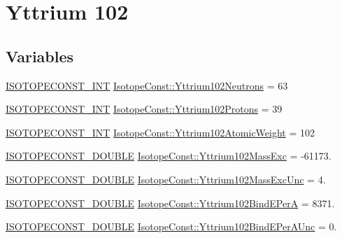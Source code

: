 \hypertarget{group___isotope_const-_yttrium-_y102}{}\section{Yttrium 102}
\label{group___isotope_const-_yttrium-_y102}
\subsection*{Variables}
\begin{DoxyCompactItemize}
\item 
\mbox{\hyperlink{group___isotope_const-_macros_ga5f18360b3e99483a35c32d789e62621c}{I\+S\+O\+T\+O\+P\+E\+C\+O\+N\+S\+T\+\_\+\+I\+NT}} \mbox{\hyperlink{group___isotope_const-_yttrium-_y102_ga104cd89e91da59d334a689852b16f7c1}{Isotope\+Const\+::\+Yttrium102\+Neutrons}} = 63
\item 
\mbox{\hyperlink{group___isotope_const-_macros_ga5f18360b3e99483a35c32d789e62621c}{I\+S\+O\+T\+O\+P\+E\+C\+O\+N\+S\+T\+\_\+\+I\+NT}} \mbox{\hyperlink{group___isotope_const-_yttrium-_y102_gaf4e5fccf02b40a6f17620ee513ca7b3a}{Isotope\+Const\+::\+Yttrium102\+Protons}} = 39
\item 
\mbox{\hyperlink{group___isotope_const-_macros_ga5f18360b3e99483a35c32d789e62621c}{I\+S\+O\+T\+O\+P\+E\+C\+O\+N\+S\+T\+\_\+\+I\+NT}} \mbox{\hyperlink{group___isotope_const-_yttrium-_y102_ga39edbc7bf0d20983f093619fbd06587a}{Isotope\+Const\+::\+Yttrium102\+Atomic\+Weight}} = 102
\item 
\mbox{\hyperlink{group___isotope_const-_macros_ga8f45a7272ce02c0b4c65c44636ed719a}{I\+S\+O\+T\+O\+P\+E\+C\+O\+N\+S\+T\+\_\+\+D\+O\+U\+B\+LE}} \mbox{\hyperlink{group___isotope_const-_yttrium-_y102_gab98bc9d63cbb586b6f76712653ae3baa}{Isotope\+Const\+::\+Yttrium102\+Mass\+Exc}} = -\/61173.
\item 
\mbox{\hyperlink{group___isotope_const-_macros_ga8f45a7272ce02c0b4c65c44636ed719a}{I\+S\+O\+T\+O\+P\+E\+C\+O\+N\+S\+T\+\_\+\+D\+O\+U\+B\+LE}} \mbox{\hyperlink{group___isotope_const-_yttrium-_y102_gae5c7a5955a3deb46264fe476ab7645ad}{Isotope\+Const\+::\+Yttrium102\+Mass\+Exc\+Unc}} = 4.
\item 
\mbox{\hyperlink{group___isotope_const-_macros_ga8f45a7272ce02c0b4c65c44636ed719a}{I\+S\+O\+T\+O\+P\+E\+C\+O\+N\+S\+T\+\_\+\+D\+O\+U\+B\+LE}} \mbox{\hyperlink{group___isotope_const-_yttrium-_y102_ga908d3d65f1f0da4b7409af844675d680}{Isotope\+Const\+::\+Yttrium102\+Bind\+E\+PerA}} = 8371.
\item 
\mbox{\hyperlink{group___isotope_const-_macros_ga8f45a7272ce02c0b4c65c44636ed719a}{I\+S\+O\+T\+O\+P\+E\+C\+O\+N\+S\+T\+\_\+\+D\+O\+U\+B\+LE}} \mbox{\hyperlink{group___isotope_const-_yttrium-_y102_ga31f17abf5579bdb35d9847e4b31ca865}{Isotope\+Const\+::\+Yttrium102\+Bind\+E\+Per\+A\+Unc}} = 0.

\end{DoxyCompactItemize}
